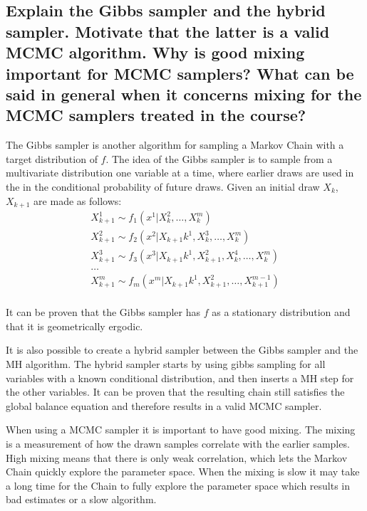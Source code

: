 \documentclass[a4paper]{article}
\begin{document}
\newpage

\subsection[The Gibbs sampler and hybrid samplers]{Explain the Gibbs sampler and the hybrid sampler. Motivate that the latter is a valid MCMC algorithm. Why is good mixing important for MCMC samplers? What can be said in general when it concerns mixing for the MCMC samplers treated in the course?}

The Gibbs sampler is another algorithm for sampling a Markov Chain with a target distribution of $f$. The idea of the Gibbs sampler is to sample from a multivariate distribution one variable at a time, where earlier draws are used in the in the conditional probability of future draws. Given an initial draw $X_k$, $X_{k+1}$ are made as follows: 
\begin{equation}
    \begin{gathered}
        X_{k+1}^1 \sim f_1(x^1|X_k^2,\dots,X_k^m) \\
        X_{k+1}^2 \sim f_2(x^2|X_{k+1}k^1,X_k^3,\dots,X_k^m) \\
        X_{k+1}^3 \sim f_3(x^3|X_{k+1}k^1,X_{k+1}^2,X_k^4,\dots,X_k^m) \\
        \dots \\
        X_{k+1}^m \sim f_m(x^m|X_{k+1}k^1,X_{k+1}^2,\dots,X_{k+1}^{m-1})\\
    \end{gathered}
\end{equation}

It can be proven that the Gibbs sampler has $f$ as a stationary distribution and that it is geometrically ergodic.

It is also possible to create a hybrid sampler between the Gibbs sampler and the MH algorithm. The hybrid sampler starts by using gibbs sampling for all variables with a known conditional distribution, and then inserts a MH step for the other variables. It can be proven that the resulting chain still satisfies the global balance equation and therefore results in a valid MCMC sampler.

When using a MCMC sampler it is important to have good mixing. The mixing is a measurement of how the drawn samples correlate with the earlier samples. High mixing means that there is only weak correlation, which lets the Markov Chain quickly explore the parameter space. When the mixing is slow it may take a long time for the Chain to fully explore the parameter space which results in bad estimates or a slow algorithm.
\end{document}
